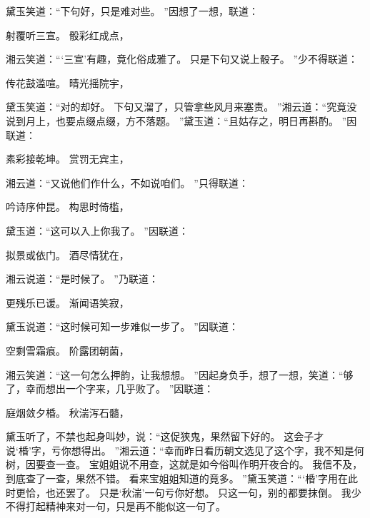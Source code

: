 \hop
黛玉笑道：“下句好，只是难对些。
”因想了一想，联道：\par
\hop
射覆听三宣。
骰彩红成点，\par
\hop
湘云笑道：“‘三宣’有趣，竟化俗成雅了。
只是下句又说上骰子。
”少不得联道：\par
\hop
传花鼓滥喧。
晴光摇院宇，
\par
\hop
黛玉笑道：“对的却好。
下句又溜了，只管拿些风月来塞责。
”湘云道：“究竟没说到月上，也要点缀点缀，方不落题。
”黛玉道：“且姑存之，明日再斟酌。
”因联道：\par
\hop
素彩接乾坤。
赏罚无宾主，\par
\hop
湘云道：“又说他们作什么，不如说咱们。
”只得联道：\par
\hop
吟诗序仲昆。
构思时倚槛，\par
\hop
黛玉道：“这可以入上你我了。
”因联道：\par
\hop
拟景或依门。
酒尽情犹在，\par
\hop
湘云说道：“是时候了。
”乃联道：\par
\hop
更残乐已谖。
渐闻语笑寂，\par
\hop
黛玉说道：“这时候可知一步难似一步了。
”因联道：\par
\hop
空剩雪霜痕。
阶露团朝菌，\par
\hop
湘云笑道：“这一句怎么押韵，让我想想。
”因起身负手，想了一想，笑道：“够了，幸而想出一个字来，几乎败了。
”因联道：\par
\hop
庭烟敛夕棔。
秋湍泻石髓，\par
\hop
黛玉听了，不禁也起身叫妙，说：“这促狭鬼，果然留下好的。
这会子才说‘棔’字，亏你想得出。
”湘云道：“幸而昨日看历朝文选见了这个字，我不知是何树，因要查一查。
宝姐姐说不用查，这就是如今俗叫作明开夜合的。
我信不及，到底查了一查，果然不错。
看来宝姐姐知道的竟多。
”黛玉笑道：“‘棔’字用在此时更恰，也还罢了。
只是‘秋湍’一句亏你好想。
只这一句，别的都要抹倒。
我少不得打起精神来对一句，只是再不能似这一句了。

